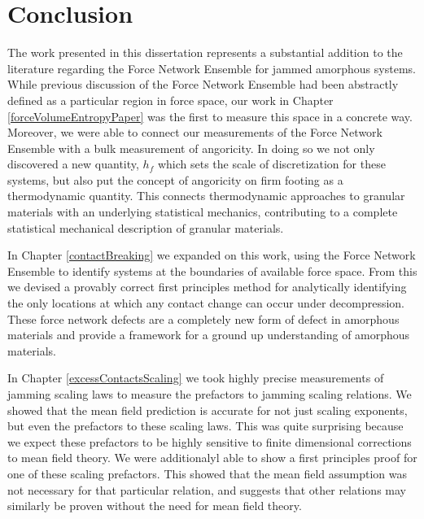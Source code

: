 \chapter{Conclusion}

The work presented in this dissertation represents a substantial addition to the literature regarding the Force Network Ensemble for jammed amorphous systems. While previous discussion of the Force Network Ensemble had been abstractly defined as a particular region in force space, our work in Chapter \ref{forceVolumeEntropyPaper} was the first to measure this space in a concrete way. Moreover, we were able to connect our measurements of the Force Network Ensemble with a bulk measurement of angoricity. In doing so we not only discovered a new quantity, $h_f$ which sets the scale of discretization for these systems, but also put the concept of angoricity on firm footing as a thermodynamic quantity. This connects thermodynamic approaches to granular materials with an underlying statistical mechanics, contributing to a complete statistical mechanical description of granular materials.

In Chapter \ref{contactBreaking} we expanded on this work, using the Force Network Ensemble to identify systems at the boundaries of available force space. From this we devised a provably correct first principles method for analytically identifying the only locations at which any contact change can occur under decompression. These force network defects are a completely new form of defect in amorphous materials and provide a framework for a ground up understanding of amorphous materials.

In Chapter \ref{excessContactsScaling} we took highly precise measurements of jamming scaling laws to measure the prefactors to jamming scaling relations. We showed that the mean field prediction is accurate for not just scaling exponents, but even the prefactors to these scaling laws. This was quite surprising because we expect these prefactors to be highly sensitive to finite dimensional corrections to mean field theory. We were additionalyl able to show a first principles proof for one of these scaling prefactors. This showed that the mean field assumption was not necessary for that particular relation, and suggests that other relations may similarly be proven without the need for mean field theory.
